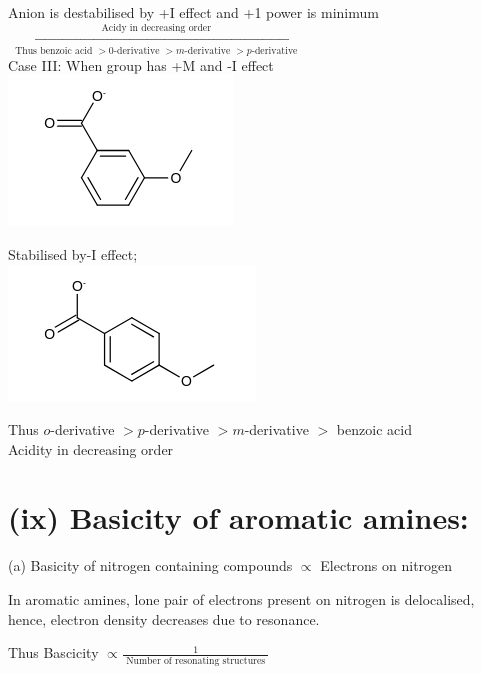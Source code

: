 \documentclass[10pt]{article}
\begin{document}
Anion is destabilised by +I effect and +1 power is minimum\\
$\xrightarrow[\text { Thus benzoic acid }>0 \text {-derivative }>m \text {-derivative }>p \text {-derivative }]{\text { Acidy in decreasing order }}$\\
Case III: When group has +M and -I effect\\
\includegraphics{smile-5654fd3707f8e2f6c38d0835d6102867455be806}

Stabilised by-I effect;\\
\includegraphics{smile-7925ece0bfb9c450449819551047fa3454de4052}

Thus $o$-derivative $>p$-derivative $>m$-derivative $>$ benzoic acid\\
Acidity in decreasing order

\section*{(ix) Basicity of aromatic amines:}
(a) Basicity of nitrogen containing compounds $\propto$ Electrons on nitrogen

In aromatic amines, lone pair of electrons present on nitrogen is delocalised, hence, electron density decreases due to resonance.

Thus Bascicity $\propto \frac{1}{\text { Number of resonating structures }}$
\end{document}
